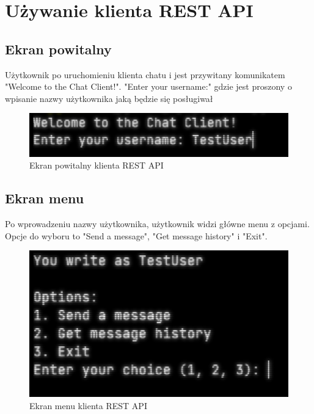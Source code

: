 \section{Używanie klienta REST API}
\subsection{Ekran powitalny}
\begin{spacing}{1.5} %
    Użytkownik po uruchomieniu klienta chatu i jest przywitany komunikatem "Welcome to the Chat Client!".
    "Enter your username:" gdzie jest proszony o wpisanie nazwy użytkownika jaką będzie się posługiwał
    \begin{figure}[ht]
        \centering
        \noindent\hspace*{-2.1cm} %
        \includegraphics[width=1.2\textwidth]{assets/client_start.png}
        \caption{Ekran powitalny klienta REST API}
        \label{fig:client_start}
    \end{figure}
\end{spacing} %

\subsection{Ekran menu}
\begin{spacing}{1.5} %
    Po wprowadzeniu nazwy użytkownika, użytkownik widzi główne menu z opcjami. Opcje do wyboru to "Send a message", "Get message history" i "Exit".
    \begin{figure}[ht]
        \centering
        \noindent\hspace*{-2.1cm} %
        \includegraphics[width=1.0\textwidth]{assets/client_menu.png}
        \caption{Ekran menu klienta REST API}
        \label{fig:client_menu}
    \end{figure}
\end{spacing} %

